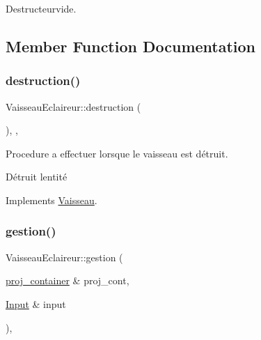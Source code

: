 Destructeurvide. 



\subsection{Member Function Documentation}
\mbox{\label{class_vaisseau_eclaireur_ab4ea82a8fc92dc27c6072481099518bc}} 
\subsubsection{\texorpdfstring{destruction()}{destruction()}}
{\footnotesize\ttfamily Vaisseau\+Eclaireur\+::destruction (\begin{DoxyParamCaption}{ }\end{DoxyParamCaption})\hspace{0.3cm}{\ttfamily [inline]}, {\ttfamily [override]}, {\ttfamily [virtual]}}



Procedure a effectuer lorsque le vaisseau est détruit. 

Détruit l\textquotesingle{}entité 

Implements \mbox{\hyperlink{class_vaisseau_a6d7506acb12c0367989066c899ec7949}{Vaisseau}}.

\mbox{\label{class_vaisseau_eclaireur_a66811ba07fd951304cca1c8be457b8e4}} 
\subsubsection{\texorpdfstring{gestion()}{gestion()}}
{\footnotesize\ttfamily Vaisseau\+Eclaireur\+::gestion (\begin{DoxyParamCaption}\item[{\mbox{\hyperlink{def__type_8h_a87980cd8ee9533e561a73e8bbc728188}{proj\+\_\+container}} \&}]{proj\+\_\+cont,  }\item[{\mbox{\hyperlink{_input_8h_a5588d60d674991c719a8df848313e966}{Input}} \&}]{input }\end{DoxyParamCaption})\hspace{0.3cm}{\ttfamily [override]}, {\ttfamily [virtual]}}



